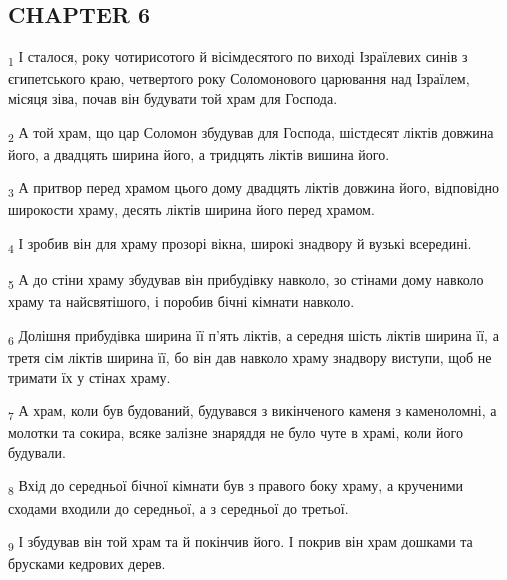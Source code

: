 \subsection{CHAPTER 6}
\begin{tcolorbox}
\textsubscript{1} І сталося, року чотирисотого й вісімдесятого по виході Ізраїлевих синів з єгипетського краю, четвертого року Соломонового царювання над Ізраїлем, місяця зіва, почав він будувати той храм для Господа.
\end{tcolorbox}
\begin{tcolorbox}
\textsubscript{2} А той храм, що цар Соломон збудував для Господа, шістдесят ліктів довжина його, а двадцять ширина його, а тридцять ліктів вишина його.
\end{tcolorbox}
\begin{tcolorbox}
\textsubscript{3} А притвор перед храмом цього дому двадцять ліктів довжина його, відповідно широкости храму, десять ліктів ширина його перед храмом.
\end{tcolorbox}
\begin{tcolorbox}
\textsubscript{4} І зробив він для храму прозорі вікна, широкі знадвору й вузькі всередині.
\end{tcolorbox}
\begin{tcolorbox}
\textsubscript{5} А до стіни храму збудував він прибудівку навколо, зо стінами дому навколо храму та найсвятішого, і поробив бічні кімнати навколо.
\end{tcolorbox}
\begin{tcolorbox}
\textsubscript{6} Долішня прибудівка ширина її п'ять ліктів, а середня шість ліктів ширина її, а третя сім ліктів ширина її, бо він дав навколо храму знадвору виступи, щоб не тримати їх у стінах храму.
\end{tcolorbox}
\begin{tcolorbox}
\textsubscript{7} А храм, коли був будований, будувався з викінченого каменя з каменоломні, а молотки та сокира, всяке залізне знаряддя не було чуте в храмі, коли його будували.
\end{tcolorbox}
\begin{tcolorbox}
\textsubscript{8} Вхід до середньої бічної кімнати був з правого боку храму, а крученими сходами входили до середньої, а з середньої до третьої.
\end{tcolorbox}
\begin{tcolorbox}
\textsubscript{9} І збудував він той храм та й покінчив його. І покрив він храм дошками та брусками кедрових дерев.
\end{tcolorbox}
